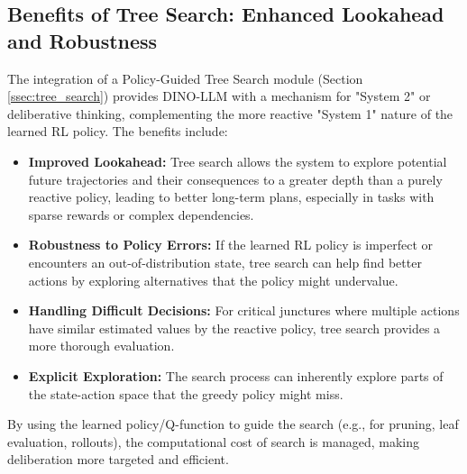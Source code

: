 \documentclass[11pt]{article}
\begin{document}
\subsection{Benefits of Tree Search: Enhanced Lookahead and Robustness}
\label{ssec:tg_tree_search}
The integration of a Policy-Guided Tree Search module (Section \ref{ssec:tree_search}) provides DINO-LLM with a mechanism for "System 2" or deliberative thinking, complementing the more reactive "System 1" nature of the learned RL policy. The benefits include:
\begin{itemize}
    \item \textbf{Improved Lookahead:} Tree search allows the system to explore potential future trajectories and their consequences to a greater depth than a purely reactive policy, leading to better long-term plans, especially in tasks with sparse rewards or complex dependencies.
    \item \textbf{Robustness to Policy Errors:} If the learned RL policy is imperfect or encounters an out-of-distribution state, tree search can help find better actions by exploring alternatives that the policy might undervalue.
    \item \textbf{Handling Difficult Decisions:} For critical junctures where multiple actions have similar estimated values by the reactive policy, tree search provides a more thorough evaluation.
    \item \textbf{Explicit Exploration:} The search process can inherently explore parts of the state-action space that the greedy policy might miss.
\end{itemize}
By using the learned policy/Q-function to guide the search (e.g., for pruning, leaf evaluation, rollouts), the computational cost of search is managed, making deliberation more targeted and efficient.
\end{document}
